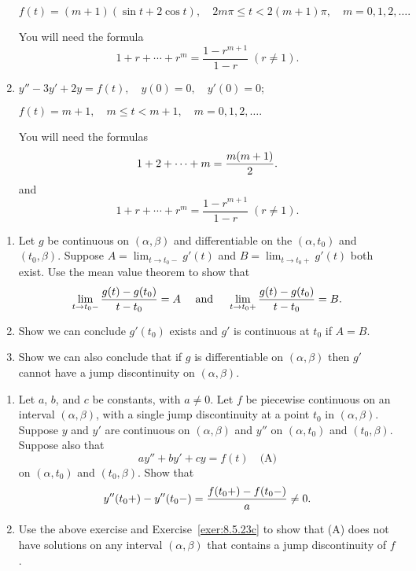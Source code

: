 \documentclass{ximera}
\begin{document}
\begin{problem}
\begin{enumerate}
$f(t)=(m+1)(\sin t+2\cos t),\quad  2m\pi\le t<2(m+1)\pi,\quad
m=0,1,2,\dots.$

\begin{hint}
You will need the formula
$$
1+r+\cdots+r^m=\frac{1-r^{m+1}}{1-r}\; (r\ne1).
$$
\end{hint}

\item %
$y''-3y'+2y=f(t), \quad  y(0)=0,\quad y'(0)=0$;

$f(t)=m+1,\quad  m\le t<m+1,\quad m=0,1,2,\dots.$

\begin{hint}
You will need the formulas
$$
1+2+\cdots+m={m(m+1)\over2}.
$$ 
and
$$
1+r+\cdots+r^m=\frac{1-r^{m+1}}{1-r}\; (r\ne1).
$$
\end{hint}
\end{enumerate}
\end{problem}


\begin{problem}\label{exer:8.5.23}
\begin{enumerate}
\item %
Let $g$ be  continuous on  $(\alpha,\beta)$
 and differentiable on the  $(\alpha,t_0)$
and $(t_0,\beta)$. Suppose $A=\lim_{t\to t_0-}g'(t)$
and $B=\lim_{t\to t_0+}g'(t)$ both exist. Use the mean value theorem
to show that
$$
\lim_{t\to t_0-}{g(t)-g(t_0)\over t-t_0}=A\quad\mbox{ and }\quad
\lim_{t\to t_0+}\frac{g(t)-g(t_0)}{t-t_0}=B.
$$
\item %
Show we can conclude $g'(t_0)$ exists and $g'$ is continuous at
$t_0$ if $A=B$.

\item\label{exer:8.5.23c} %
Show we can also conclude
 that if $g$  is differentiable on $(\alpha,\beta)$ then
$g'$ cannot have a jump discontinuity on $(\alpha,\beta)$.
\end{enumerate}
\end{problem}

\begin{problem}\label{exer:8.5.24}
\begin{enumerate}
\item %
Let $a$, $b$, and $c$ be constants, with $a\ne0$. Let $f$ be piecewise
continuous on an interval $(\alpha,\beta)$, with a single jump
discontinuity at a point $t_0$ in $(\alpha,\beta)$. Suppose $y$
and $y'$ are continuous on $(\alpha,\beta)$ and $y''$ on
$(\alpha,t_0)$ and $(t_0,\beta)$. Suppose  also that
$$
ay''+by'+cy=f(t) \quad
\text{(A)}
$$
on $(\alpha,t_0)$ and $(t_0,\beta)$.
Show that
$$
y''(t_0+)-y''(t_0-)={f(t_0+)-f(t_0-)\over a}\ne0.
$$
\item %
Use the above exercise and Exercise~\ref{exer:8.5.23c} to show that
(A)
does not  have  solutions on any interval $(\alpha,\beta)$ that contains
a jump discontinuity of $f$.
\end{enumerate}
\end{problem}
\end{document}
